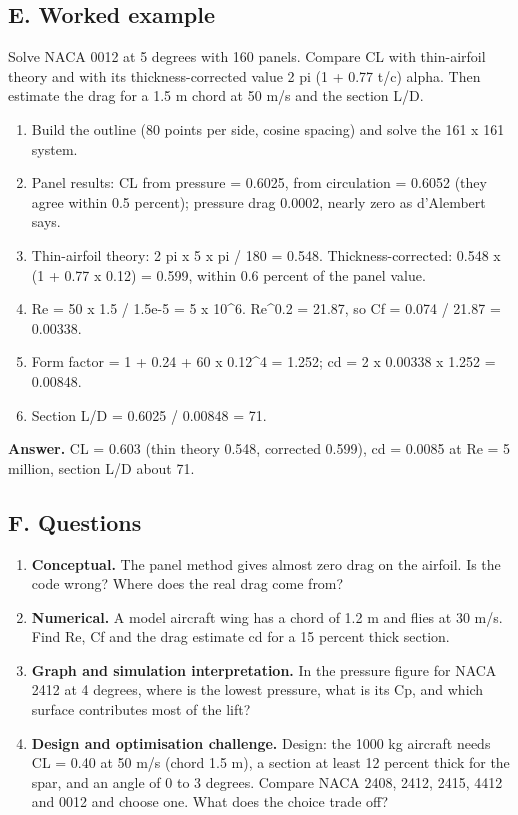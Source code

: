 \documentclass[11pt,a4paper]{article}
\begin{document}
\subsection*{E. Worked example}
Solve NACA 0012 at 5 degrees with 160 panels. Compare CL with thin-airfoil theory and with its thickness-corrected value 2 pi (1 + 0.77 t/c) alpha. Then estimate the drag for a 1.5 m chord at 50 m/s and the section L/D.
\begin{enumerate}[nosep]
\item Build the outline (80 points per side, cosine spacing) and solve the 161 x 161 system.
\item Panel results: CL from pressure = 0.6025, from circulation = 0.6052 (they agree within 0.5 percent); pressure drag 0.0002, nearly zero as d'Alembert says.
\item Thin-airfoil theory: 2 pi x 5 x pi / 180 = 0.548. Thickness-corrected: 0.548 x (1 + 0.77 x 0.12) = 0.599, within 0.6 percent of the panel value.
\item Re = 50 x 1.5 / 1.5e-5 = 5 x 10\textasciicircum{}6. Re\textasciicircum{}0.2 = 21.87, so Cf = 0.074 / 21.87 = 0.00338.
\item Form factor = 1 + 0.24 + 60 x 0.12\textasciicircum{}4 = 1.252; cd = 2 x 0.00338 x 1.252 = 0.00848.
\item Section L/D = 0.6025 / 0.00848 = 71.
\end{enumerate}
\textbf{Answer.} CL = 0.603 (thin theory 0.548, corrected 0.599), cd = 0.0085 at Re = 5 million, section L/D about 71.

\subsection*{F. Questions}
\begin{enumerate}[nosep]
\item \textbf{Conceptual.} The panel method gives almost zero drag on the airfoil. Is the code wrong? Where does the real drag come from?
\item \textbf{Numerical.} A model aircraft wing has a chord of 1.2 m and flies at 30 m/s. Find Re, Cf and the drag estimate cd for a 15 percent thick section.
\item \textbf{Graph and simulation interpretation.} In the pressure figure for NACA 2412 at 4 degrees, where is the lowest pressure, what is its Cp, and which surface contributes most of the lift?
\item \textbf{Design and optimisation challenge.} Design: the 1000 kg aircraft needs CL = 0.40 at 50 m/s (chord 1.5 m), a section at least 12 percent thick for the spar, and an angle of 0 to 3 degrees. Compare NACA 2408, 2412, 2415, 4412 and 0012 and choose one. What does the choice trade off?
\end{enumerate}
\end{document}
